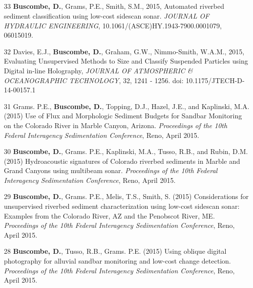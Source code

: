 \documentclass[margin,line]{resume}
\begin{document}
\begin{resume}
\begin{footnotesize}
\begin{list1}
	\end{list1}

	\subsection{}
	\begin{list1}
		
	\item[33] {\bf Buscombe, D.}, Grams, P.E., Smith, S.M., 2015, Automated riverbed sediment classification using low-cost sidescan sonar. {\sl JOURNAL OF HYDRAULIC ENGINEERING}, 10.1061/(ASCE)HY.1943-7900.0001079, 06015019.\\
	
	\item[32] Davies, E.J., {\bf Buscombe, D.}, Graham, G.W., Nimmo-Smith, W.A.M., 2015, Evaluating Unsupervised Methods to Size and Classify Suspended Particles using Digital in-line Holography, {\sl JOURNAL OF ATMOSPHERIC \& OCEANOGRAPHIC TECHNOLOGY}, 32, 1241 - 1256. doi: 10.1175/JTECH-D-14-00157.1 \\

        \item[31] Grams. P.E., {\bf Buscombe, D.}, Topping, D.J., Hazel, J.E., and Kaplinski, M.A. (2015) Use of Flux and Morphologic Sediment Budgets for Sandbar Monitoring on the Colorado River in Marble Canyon, Arizona. {\sl Proceedings of the 10th Federal Interagency Sedimentation Conference}, Reno, April 2015.\\

        \item[30] {\bf Buscombe, D.}, Grams. P.E., Kaplinski, M.A., Tusso, R.B., and Rubin, D.M. (2015) Hydroacoustic signatures of Colorado riverbed sediments in Marble and Grand Canyons using multibeam sonar. {\sl Proceedings of the 10th Federal Interagency Sedimentation Conference}, Reno, April 2015.\\

        \item[29] {\bf Buscombe, D.}, Grams. P.E., Melis, T.S., Smith, S. (2015) Considerations for unsupervised riverbed sediment characterization using low-cost sidescan sonar: Examples from the Colorado River, AZ and the Penobscot River, ME. {\sl Proceedings of the 10th Federal Interagency Sedimentation Conference}, Reno, April 2015.\\

        \item[28] {\bf Buscombe, D.}, Tusso, R.B., Grams. P.E. (2015) Using oblique digital photography for alluvial sandbar monitoring and low-cost change detection. {\sl Proceedings of the 10th Federal Interagency Sedimentation Conference}, Reno, April 2015.
	

\end{list1}
\end{footnotesize}
\end{resume}
\end{document}
